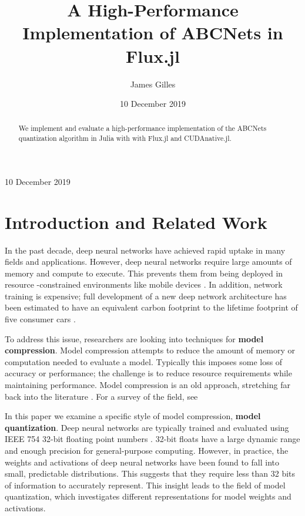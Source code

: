 \documentclass[12pt]{article}
\author{James Gilles}
\date{10 December 2019}
\title{A High-Performance Implementation of ABCNets in Flux.jl}
\renewcommand*{\tableofcontents}{}
\renewcommand*{\tableofcontents}[0]{}
\begin{document}
\maketitle
\tableofcontents

\begin{abstract}
We implement and evaluate a high-performance implementation of the ABCNets quantization algorithm in Julia with with Flux.jl and CUDAnative.jl.
\end{abstract}

10 December 2019

\section{Introduction and Related Work}
\label{sec:org3dd8475}

In the past decade, deep neural networks have achieved rapid uptake in many fields
and applications. However, deep neural networks require large amounts
of memory and compute to execute. This prevents them from being deployed in resource
-constrained environments like mobile devices \citep{MobileNets}. In addition,
network training is expensive; full
development of a new deep network architecture has been estimated to have an equivalent
carbon footprint to the lifetime footprint of five consumer cars \citep{EmitCarbon}.

To address this issue, researchers are looking into techniques for \textbf{model compression}.
Model compression attempts to reduce the amount of memory or computation needed to evaluate a model. Typically this imposes some loss of accuracy or performance; the challenge is to
reduce resource requirements while maintaining performance.
Model compression is an old approach, stretching far back into the literature \citep{OptimalBrainDamage}. For a survey of the field, see \citep{CompressionSurvey}

In this paper we examine a specific style of model compression, \textbf{model quantization}. Deep neural networks are typically trained and evaluated using IEEE 754 32-bit floating point numbers \citep{IEEE754}. 32-bit floats have a large dynamic range and enough precision for general-purpose computing.
However, in practice, the weights and activations of deep neural networks have been found to fall into small, predictable distributions.
This suggests that they require less than 32 bits of information to accurately represent.
This insight leads to the field of model quantization, which investigates different representations for model weights and activations.
\end{document}
